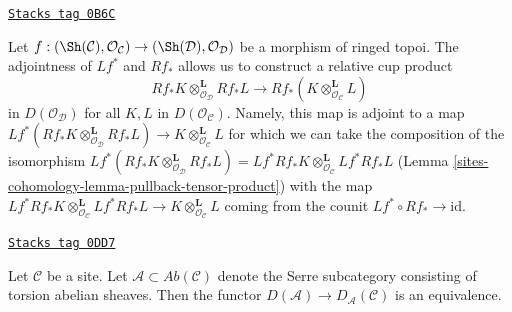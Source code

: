 \begin{remark}
\label{sites-cohomology-remark-cup-product}
\href{https://stacks.math.columbia.edu/tag/0B6C}{\texttt{Stacks tag 0B6C}}

Let $f : (\Sh(\mathcal{C}), \mathcal{O}_\mathcal{C}) \to
(\Sh(\mathcal{D}), \mathcal{O}_\mathcal{D})$ be a morphism of
ringed topoi. The adjointness of $Lf^*$ and $Rf_*$ allows us to construct
a relative cup product
$$
Rf_*K \otimes_{\mathcal{O}_\mathcal{D}}^\mathbf{L} Rf_*L
\longrightarrow
Rf_*(K \otimes_{\mathcal{O}_\mathcal{C}}^\mathbf{L} L)
$$
in $D(\mathcal{O}_\mathcal{D})$ for all $K, L$ in $D(\mathcal{O}_\mathcal{C})$.
Namely, this map is adjoint to a map
$Lf^*(Rf_*K \otimes_{\mathcal{O}_\mathcal{D}}^\mathbf{L} Rf_*L) \to
K \otimes_{\mathcal{O}_\mathcal{C}}^\mathbf{L} L$ for which we can take the
composition of the isomorphism
$Lf^*(Rf_*K \otimes_{\mathcal{O}_\mathcal{D}}^\mathbf{L} Rf_*L) =
Lf^*Rf_*K \otimes_{\mathcal{O}_\mathcal{C}}^\mathbf{L} Lf^*Rf_*L$
(Lemma \ref{sites-cohomology-lemma-pullback-tensor-product})
with the map
$Lf^*Rf_*K \otimes_{\mathcal{O}_\mathcal{C}}^\mathbf{L} Lf^*Rf_*L
\to K \otimes_{\mathcal{O}_\mathcal{C}}^\mathbf{L} L$
coming from the counit $Lf^* \circ Rf_* \to \text{id}$.
\end{remark}

\begin{lemma}[Torsion]
\label{sites-cohomology-lemma-torsion}
\href{https://stacks.math.columbia.edu/tag/0DD7}{\texttt{Stacks tag 0DD7}}

Let $\mathcal{C}$ be a site. Let $\mathcal{A} \subset \textit{Ab}(\mathcal{C})$
denote the Serre subcategory consisting of torsion abelian sheaves.
Then the functor $D(\mathcal{A}) \to D_\mathcal{A}(\mathcal{C})$
is an equivalence.
\end{lemma}


